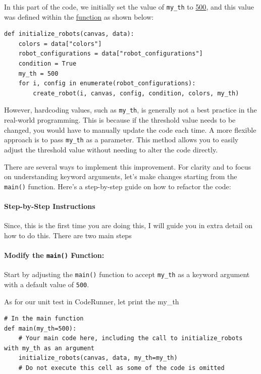 In this part of the code, we initially set the value of \texttt{my\_th} to \href{https://github.com/balandongiv/computer_programming_gist/blob/main/session5/session5_robot_template.py#L135}{500}, and this value was defined within the \href{https://github.com/balandongiv/computer_programming_gist/blob/main/session5/session5_robot_template.py#L121}{function} as shown below:

\begin{verbatim}
def initialize_robots(canvas, data):
    colors = data["colors"]
    robot_configurations = data["robot_configurations"]
    condition = True
    my_th = 500
    for i, config in enumerate(robot_configurations):
        create_robot(i, canvas, config, condition, colors, my_th)
\end{verbatim}
However, hardcoding values, such as \texttt{my\_th}, is generally not a best practice in the real-world programming. This is because if the threshold value needs to be changed, you would have to manually update the code each time. A more flexible approach is to pass \texttt{my\_th} as a parameter. This method allows you to easily adjust the threshold value without needing to alter the code directly.

There are several ways to implement this improvement. For clarity and to focus on understanding keyword arguments, let's make changes starting from the \texttt{main()} function. Here's a step-by-step guide on how to refactor the code:

\paragraph{Step-by-Step Instructions}
Since, this is the first time you are doing this, I will guide you in extra detail on how to do this. There are two main steps

\paragraph*{Modify the \texttt{main()} Function:}
Start by adjusting the \texttt{main()} function to accept \texttt{my\_th} as a keyword argument with a default value of \texttt{500}.

As for our unit test in CodeRunner, let print the my\_th
\begin{verbatim}
# In the main function
def main(my_th=500):
    # Your main code here, including the call to initialize_robots with my_th as an argument
    initialize_robots(canvas, data, my_th=my_th)
    # Do not execute this cell as some of the code is omitted
\end{verbatim}

